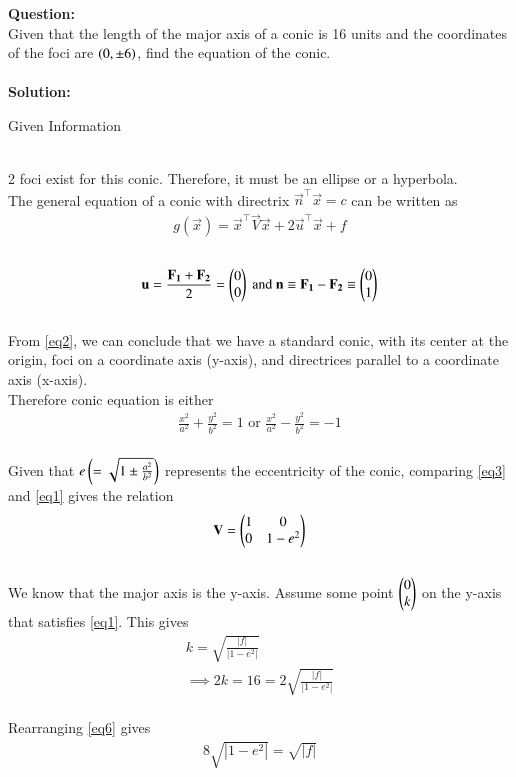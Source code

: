\documentclass[journal]{IEEEtran}
\begin{document}
\textbf{Question:}\\
Given that the length of the major axis of a conic is 16 units and the coordinates of the foci are $\left(0,\pm6\right)$, find the equation of the conic.
\\ \\
\textbf{Solution:} \\
\begin{table}[h!]
  \centering
  
  \caption{Given Information}
  \label{Table 1}
\end{table} \\
2 foci exist for this conic. Therefore, it must be an ellipse or a hyperbola.
\\
The general equation of a conic with directrix $\vec{n}^\top\vec{x}=c$ can be written as 
\begin{align}
g(\vec{x}) = \vec{x}^\top\vec{V}\vec{x}+2\vec{u}^\top\vec{x}+f \label{eq1}
\end{align}
\\
\begin{align}
\mathbf{u} =\frac{\mathbf{F_1}+\mathbf{F_2}}{2}=\begin{pmatrix}0\\0\end{pmatrix} \text{ and } \mathbf{n}\equiv\mathbf{F_1}-\mathbf{F_2}\equiv\begin{pmatrix}0\\1\end{pmatrix} \label{eq2}
\end{align}
\\
From \ref{eq2}, we can conclude that we have a standard conic, with its center at the origin, foci on a coordinate axis (y-axis), and directrices parallel to a coordinate axis (x-axis).
\\
Therefore conic equation is either 
\begin{align}
\frac{x^2}{a^2} + \frac{y^2}{b^2} = 1 \text{ or } \frac{x^2}{a^2} - \frac{y^2}{b^2} = -1 \label{eq3}
\end{align}
\\
Given that $e \left(=\sqrt{1\pm\frac{a^2}{b^2}}\right)$ represents the eccentricity of the conic, comparing \ref{eq3} and \ref{eq1} gives the relation
\begin{align}
\mathbf{V} = \begin{pmatrix}1&0\\0&1-e^2\end{pmatrix}
\end{align}
\\
We know that the major axis is the y-axis. Assume some point $\begin{pmatrix}0\\k\end{pmatrix}$ on the y-axis that satisfies \ref{eq1}. This gives
\begin{align}
k = \sqrt{\frac{|f|}{|1-e^2|}}
\\
\implies 2k = 16 = 2\sqrt{\frac{|f|}{|1-e^2|}} \label{eq6}
\end{align}
\\
Rearranging \ref{eq6} gives 
\begin{align}
8\sqrt{|1-e^2|}=\sqrt{|f|} \label{eq7}
\end{align}
\end{document}
